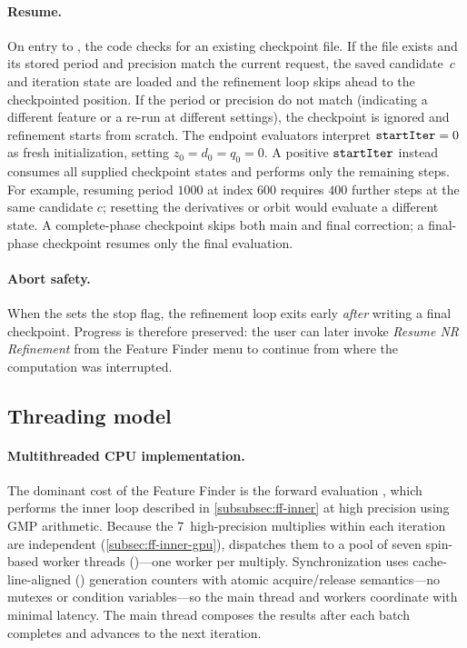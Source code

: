 \paragraph{Resume.}
On entry to , the code checks for an existing
checkpoint file.  If the file exists and its stored period and precision
match the current request, the saved candidate~$c$ and iteration state
are loaded and the refinement loop skips ahead to the checkpointed
position.  If the period or precision do not match (indicating a
different feature or a re-run at different settings), the checkpoint is
ignored and refinement starts from scratch.  The endpoint evaluators interpret
$\texttt{startIter}=0$ as fresh initialization, setting $z_0=d_0=q_0=0$.
A positive $\texttt{startIter}$ instead consumes all supplied checkpoint states
and performs only the remaining steps.  For example, resuming period $1000$
at index $600$ requires $400$ further steps at the same candidate $c$;
resetting the derivatives or orbit would evaluate a different state.  A
complete-phase checkpoint skips both main and final correction; a final-phase
checkpoint resumes only the final evaluation.

\paragraph{Abort safety.}
When the  sets the stop flag, the refinement loop
exits early \emph{after} writing a final checkpoint.  Progress is
therefore preserved: the user can later invoke \emph{Resume NR
Refinement} from the Feature Finder menu to continue from where the
computation was interrupted.

\subsection{Threading model}
\label{subsec:ff-threading}

\paragraph{Multithreaded CPU implementation.}
The dominant cost of the Feature Finder is the forward evaluation
, which performs the inner loop
described in \cref{subsubsec:ff-inner} at high precision using GMP
 arithmetic.  Because the 7~high-precision multiplies within
each iteration are independent (\cref{subsec:ff-inner-gpu}),
\FractalShark{} dispatches them to a pool of seven spin-based worker
threads ()---one worker per multiply.
Synchronization uses cache-line-aligned () generation
counters with atomic acquire/release semantics---no mutexes or condition
variables---so the main thread and workers coordinate with minimal latency.
The main thread composes the results after each batch completes and
advances to the next iteration.

